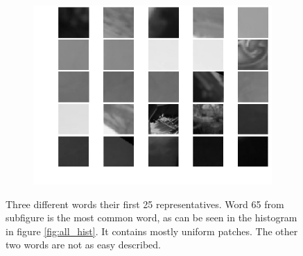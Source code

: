 \documentclass{paper}
\begin{document}
\begin{figure}
\begin{subfigure}[b]{0.32\textwidth}
    \includegraphics[width=\textwidth]{word949}
    \label{fig:949}
  \end{subfigure}
\caption{Three different words their first 25 representatives. Word 65 from subfigure 
is the most common word, as can be seen in the histogram in figure \ref{fig:all_hist}. It contains 
mostly uniform patches. The other two words are not as easy described.}
\label{fig:words}
\end{figure}
\end{document}
